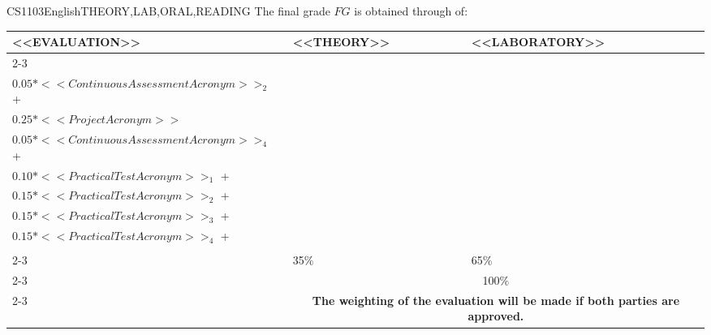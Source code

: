   \begin{evaluation}{CS1103}{English}{THEORY,LAB,ORAL,READING}
  The final grade $FG$ is obtained through of:
 
  \begin{tabularx}{0.9\textwidth}{|X|p{}|p{}|} \hline
    \multirow{4}{*}{\uppercase{<<Evaluation>>}} & \uppercase{<<Theory>>} & \uppercase{<<Laboratory>>} \\ \cline{2-3}
    & %
        \begin{minipage}{0.95\textwidth}
        \begin{tabular}{l}
            $0.05*<<ContinuousAssessmentAcronym>>_{1}$  + \\
            $0.05*<<ContinuousAssessmentAcronym>>_{2}$  + \\
            $0.25*<<ProjectAcronym>>$
            \end{tabular} 
        \end{minipage} 
    & %
        \begin{minipage}{0.95\textwidth}
        \begin{tabular}{l}
          $0.05*<<ContinuousAssessmentAcronym>>_{3}$ + \\
          $0.05*<<ContinuousAssessmentAcronym>>_{4}$ + \\
          $0.10*<<PracticalTestAcronym>>_{1}$ + \\
          $0.15*<<PracticalTestAcronym>>_{2}$ + \\
          $0.15*<<PracticalTestAcronym>>_{3}$ + \\
          $0.15*<<PracticalTestAcronym>>_{4}$ + \\
        \end{tabular} 
        \end{minipage}                 \\ \cline{2-3}
    & %
    35\% 
    & %
    65\% \\ \cline{2-3}
    & \multicolumn{2}{c|}{100\%}  \\ \cline{2-3}
    & \multicolumn{2}{c|}{\textbf{The weighting of the evaluation will be made if both parties are approved.}}  \\ \hline
    \end{tabularx}
      

\end{evaluation}
